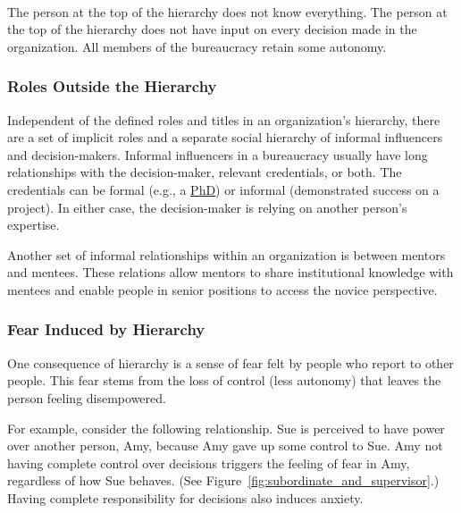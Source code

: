 \ \\

The person at the top of the hierarchy does not know everything. The person at the top of the hierarchy does not have input on every decision made in the organization. All members of the bureaucracy retain some autonomy.

\subsubsection*{Roles Outside the Hierarchy}

Independent of the defined roles and titles in an organization's hierarchy, there are a set of implicit roles and a separate social hierarchy of informal influencers and decision-makers. Informal influencers in a bureaucracy usually have long relationships with the decision-maker, relevant credentials, or both. The credentials can be formal (e.g., a \href{https://en.wikipedia.org/wiki/Doctor_of_Philosophy}{PhD}) 
\iftoggle{WPinmargin}{\marginpar{$>$Wikipedia: Doctor of Philosophy}}{}
or informal (demonstrated success on a project). In either case, the decision-maker is relying on another person's expertise. 

Another set of informal relationships within an organization is between mentors and mentees. These relations allow mentors to share institutional knowledge with mentees and enable people in senior positions to access the novice perspective. 


\subsubsection*{Fear Induced by Hierarchy}

One consequence of hierarchy is a sense of fear felt by people who report to other people. This fear stems from the loss of control (less autonomy) that leaves the person feeling disempowered. 

For example, consider the following relationship. Sue is perceived to have power over another person, Amy, because Amy gave up some control to Sue. Amy not having complete control over decisions triggers the feeling of fear in Amy, regardless of how Sue behaves. (See Figure~\ref{fig:subordinate_and_supervisor}.) Having complete responsibility for decisions also induces anxiety.

